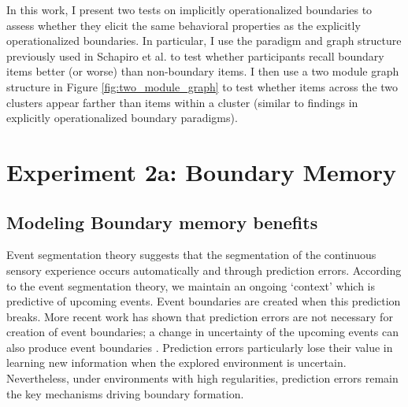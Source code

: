 
In this work, I present two tests on implicitly operationalized boundaries to assess whether they elicit the same behavioral properties as the explicitly operationalized boundaries. In particular, I use the paradigm and graph structure previously used in Schapiro et al. \cite{schapiro2013neural} to test whether participants recall boundary items better (or worse) than non-boundary items. I then use a two module graph structure in Figure \ref{fig:two_module_graph} to test whether items across the two clusters appear farther than items within a cluster (similar to findings in explicitly operationalized boundary paradigms). 

\section{Experiment 2a: Boundary Memory}
\subsection*{Modeling Boundary memory benefits}
Event segmentation theory suggests that the segmentation of the continuous sensory experience occurs automatically and through prediction errors\cite{zacks2007event,zacks2007eventp, swallow2009event}. According to the event segmentation theory, we maintain an ongoing `context' which is predictive of upcoming events. Event boundaries are created when this prediction breaks. More recent work has shown that prediction errors are not necessary for creation of event boundaries; a change in uncertainty of the upcoming events can also produce event boundaries \cite{shin2021structuring}. Prediction errors particularly lose their value in learning new information when the explored environment is uncertain\cite{behrens2007learning}. Nevertheless, under environments with high regularities, prediction errors remain the key mechanisms driving boundary formation. 

